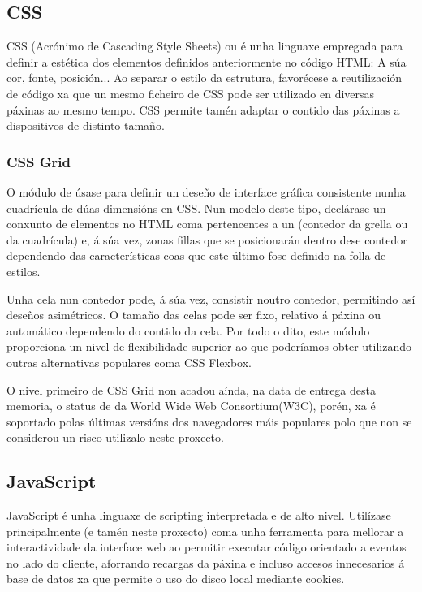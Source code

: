 \subsection{CSS}

CSS (Acrónimo de Cascading Style Sheets) ou  é unha linguaxe empregada para definir a estética dos elementos definidos anteriormente no código HTML: A súa cor, fonte, posición... Ao separar o estilo da estrutura, favorécese a reutilización de código xa que un mesmo ficheiro de CSS pode ser utilizado en diversas páxinas ao mesmo tempo. CSS permite tamén adaptar o contido das páxinas a dispositivos de distinto tamaño\cite{css_w3c}.

\subsubsection{CSS Grid}

O módulo de  úsase para definir un deseño de interface gráfica consistente nunha cuadrícula de dúas dimensións en CSS. Nun modelo deste tipo, declárase un conxunto de elementos no HTML coma pertencentes a un (contedor da grella ou da cuadrícula) e, á súa vez, zonas fillas que se posicionarán dentro dese contedor dependendo das características coas que este último fose definido na folla de estilos.

Unha cela nun contedor pode, á súa vez, consistir noutro contedor, permitindo así deseños asimétricos. O tamaño das celas pode ser fixo, relativo á páxina ou automático dependendo do contido da cela. Por todo o dito, este módulo proporciona un nivel de flexibilidade superior ao que poderíamos obter utilizando outras alternativas populares coma CSS Flexbox. 

O nivel primeiro de CSS Grid non acadou aínda, na data de entrega desta memoria, o status de  da  World Wide Web Consortium(W3C)\cite{css_grid_w3c}, porén, xa é soportado polas últimas versións dos navegadores máis populares\cite{css_grid_w3c2} polo que non se considerou un risco utilizalo neste proxecto.

\subsection{JavaScript}

JavaScript é unha linguaxe de scripting interpretada e de alto nivel. Utilízase principalmente (e tamén neste proxecto) coma unha ferramenta para mellorar a interactividade da interface web ao permitir executar código orientado a eventos no lado do cliente, aforrando recargas da páxina e incluso accesos innecesarios á base de datos xa que permite o uso do disco local mediante cookies. 

